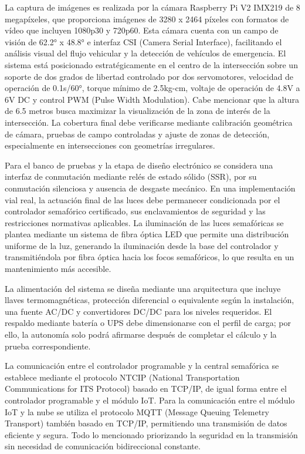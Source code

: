 \documentclass[12pt,a4paper,oneside]{report}
\begin{document}
La captura de imágenes es realizada por la cámara Raspberry Pi V2 IMX219 de 8 megapíxeles, que proporciona imágenes de 3280 x 2464 píxeles con formatos de vídeo que incluyen 1080p30 y 720p60. Esta cámara cuenta con un campo de visión de 62.2° x 48.8° e interfaz CSI (Camera Serial Interface), facilitando el análisis visual del flujo vehicular y la detección de vehículos de emergencia. El sistema está posicionado estratégicamente en el centro de la intersección sobre un soporte de dos grados de libertad controlado por dos servomotores, velocidad de operación de 0.1s/60°, torque mínimo de 2.5kg-cm, voltaje de operación de 4.8V a 6V DC y control PWM (Pulse Width Modulation). Cabe mencionar que la altura de 6.5 metros busca maximizar la visualización de la zona de interés de la intersección. La cobertura final debe verificarse mediante calibración geométrica de cámara, pruebas de campo controladas y ajuste de zonas de detección, especialmente en intersecciones con geometrías irregulares.

Para el banco de pruebas y la etapa de diseño electrónico se considera una interfaz de conmutación mediante relés de estado sólido (SSR), por su conmutación silenciosa y ausencia de desgaste mecánico. En una implementación vial real, la actuación final de las luces debe permanecer condicionada por el controlador semafórico certificado, sus enclavamientos de seguridad y las restricciones normativas aplicables. La iluminación de las luces semafóricas se plantea mediante un sistema de fibra óptica LED que permite una distribución uniforme de la luz, generando la iluminación desde la base del controlador y transmitiéndola por fibra óptica hacia los focos semafóricos, lo que resulta en un mantenimiento más accesible.

La alimentación del sistema se diseña mediante una arquitectura que incluye llaves termomagnéticas, protección diferencial o equivalente según la instalación, una fuente AC/DC y convertidores DC/DC para los niveles requeridos. El respaldo mediante batería o UPS debe dimensionarse con el perfil de carga; por ello, la autonomía solo podrá afirmarse después de completar el cálculo y la prueba correspondiente.

La comunicación entre el controlador programable y la central semafórica se establece mediante el protocolo NTCIP (National Transportation Communications for ITS Protocol) basado en TCP/IP, de igual forma entre el controlador programable y el módulo IoT. Para la comunicación entre el módulo IoT y la nube se utiliza el protocolo MQTT (Message Queuing Telemetry Transport) también basado en TCP/IP, permitiendo una transmisión de datos eficiente y segura. Todo lo mencionado priorizando la seguridad en la transmisión sin necesidad de comunicación bidireccional constante.
\end{document}
